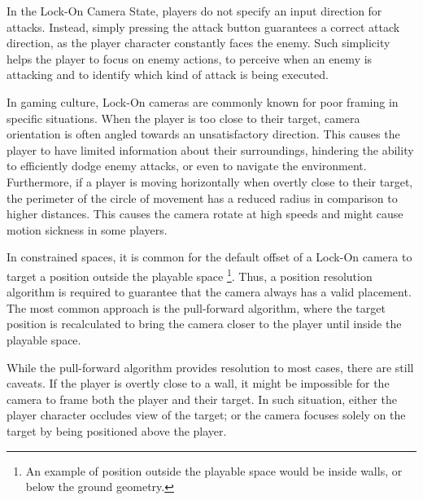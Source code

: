 In the Lock-On Camera State, players do not specify an input direction for attacks. Instead, simply pressing the attack button guarantees a correct attack direction, as the player character constantly faces the enemy. Such simplicity helps the player to focus on enemy actions, to perceive when an enemy is attacking and to identify which kind of attack is being executed.

In gaming culture, Lock-On cameras are commonly known for poor framing in specific situations. When the player is too close to their target, camera orientation is often angled towards an unsatisfactory direction. This causes the player to have limited information about their surroundings, hindering the ability to efficiently dodge enemy attacks, or even to navigate the environment. Furthermore, if a player is moving horizontally when overtly close to their target, the perimeter of the circle of movement has a reduced radius in comparison to higher distances. This causes the camera rotate at high speeds and might cause motion sickness in some players.

In constrained spaces, it is common for the default offset of a Lock-On camera to target a position outside the playable space \footnote{An example of position outside the playable space would be inside walls, or below the ground geometry.}. Thus, a position resolution algorithm is required to guarantee that the camera always has a valid placement. The most common approach is the pull-forward algorithm, where the target position is recalculated to bring the camera closer to the player until inside the playable space.

While the pull-forward algorithm provides resolution to most cases, there are still caveats. If the player is overtly close to a wall, it might be impossible for the camera to frame both the player and their target. In such situation, either the player character occludes view of the target; or the camera focuses solely on the target by being positioned above the player.

